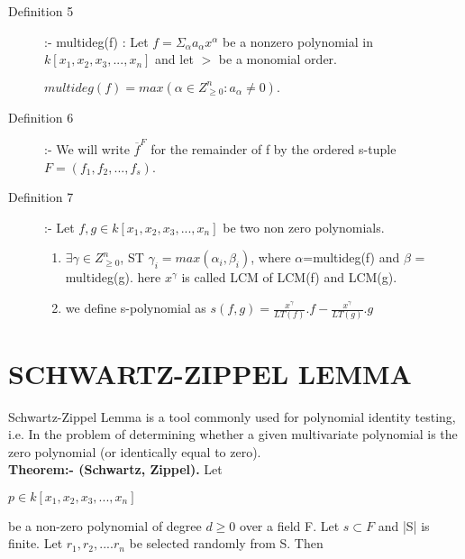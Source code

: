 \documentclass[12pt]{article}
\begin{document}
\begin{description}
\item[Definition 5] :- multideg(f) : Let $f =\Sigma_{\alpha} a_{\alpha} x^{\alpha}$ be a nonzero polynomial in $k[x_{1},x_{2},x_{3},...,x_{n}]$ and let $>$ be a monomial order.
\begin{center}
$multideg(f)= max(\alpha \in Z_{\geq 0}^{n} : a_{\alpha} \neq 0 ).$
\end{center}
\item[Definition 6] :- We will write $ \overline{f}^{F}$ for the remainder of f by the ordered s-tuple $F=(f_{1},f_{2},...,f_{s})$.
\item[Definition 7] :- Let $f,g \in  k[x_{1},x_{2},x_{3},...,x_{n}]$ be two non zero polynomials.
\begin{enumerate}
\item $\exists \gamma \in Z_{\geq 0}^{n}$, ST $\gamma_{i}=max(\alpha_{i},\beta_{i})$, where $\alpha$=multideg(f) and $\beta$ = multideg(g). here $x^{\gamma}$ is called LCM of LCM(f) and LCM(g).
\item we define s-polynomial as $s(f,g) = \frac{x^{\gamma}}{LT(f)}.f-\frac{x^{\gamma}}{LT(g)}.g$ 
\end{enumerate}
\end{description}

\section{SCHWARTZ-ZIPPEL LEMMA}
Schwartz-Zippel Lemma is a tool commonly used for polynomial identity testing, i.e. In the problem of determining whether a given multivariate polynomial is the zero polynomial (or identically equal to zero).\\
{\bf Theorem:- (Schwartz, Zippel).} Let
\begin{center}
$p \in k[x_{1} ,x_{2} ,x_{3},...,x_{n}]$\\
\end{center}
be a non-zero polynomial of degree $d \geq 0$ over a field F. Let $s \subset F$ and |S| is finite. Let $r_{1},r_{2},....r_{n}$ be selected randomly from S. Then 
\end{document}
